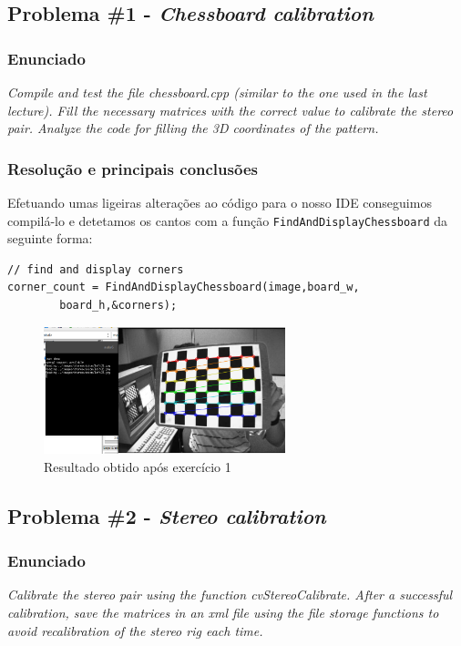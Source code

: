 \documentclass[portuguese, times, mirror]{revdetua}
\begin{document}
\subsection{Problema \#1 - \textit{Chessboard calibration}}

\subsubsection{Enunciado}
\textit{Compile and test the file chessboard.cpp (similar to the one used in the last lecture). Fill the necessary matrices with the correct value to calibrate the stereo pair. Analyze the code for filling the 3D coordinates of the pattern.}


\subsubsection{Resolução e principais conclusões}

Efetuando umas ligeiras alterações ao código para o nosso IDE conseguimos compilá-lo e detetamos os cantos com a função \texttt{FindAndDisplayChessboard} da seguinte forma: 

\begin{lstlisting}[caption=Função contagem dos cantos,label=code:C]
// find and display corners
corner_count = FindAndDisplayChessboard(image,board_w,
        board_h,&corners);
\end{lstlisting}


\begin{figure}[ht!]
\centering
\includegraphics[width=70mm]{img/ex1.png}
\caption{Resultado obtido após exercício 1}
\end{figure}



\subsection{Problema \#2 - \textit{Stereo calibration}}

\subsubsection{Enunciado}
\textit{Calibrate the stereo pair using the function cvStereoCalibrate. After a successful calibration, save the matrices in an xml file using the file storage functions to
avoid recalibration of the stereo rig each time.}
\end{document}
